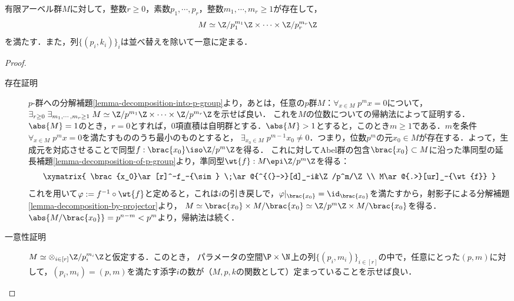\documentclass[uplatex,dvipdfmx]{jsreport}
\begin{document}
\begin{theorem}
    有限アーベル群$M$に対して，整数$r\ge 0$，素数$p_1,\cdots,p_r$，整数$m_1,\cdots,m_r\ge 1$が存在して，
    \[
        M\simeq \Z/p_1^{m_1}\Z\times\cdots\times\Z/p_r^{m_r}\Z
    \]
    を満たす．また，列$\{(p_i,k_i)\}_i$は並べ替えを除いて一意に定まる．
\end{theorem}
\begin{proof}\mbox{}
    \begin{description}
        \item[存在証明] $p$-群への分解補題\ref{lemma-decomposition-into-p-group}より，あとは，任意の$p$群$M$：$\forall_{x\in M}\;p^mx=0$について，$\exists_{r\ge 0}\;\exists_{m_1,\cdots,m_r\ge 1}\;M\simeq\Z/p^{m_1}\Z\times\cdots\times\Z/p^{m_r}\Z$を示せば良い．
        これを$M$の位数についての帰納法によって証明する．$\abs{M}=1$のとき，$r=0$とすれば，$0$項直積は自明群とする．$\abs{M}>1$とすると，このとき$m\ge 1$である．$m$を条件$\forall_{x\in M}\;p^mx=0$を満たすもののうち最小のものとすると，
        $\exists_{x_0\in M}\;p^{m-1}x_0\ne 0$．つまり，位数$p^m$の元$x_0\in M$が存在する．よって，生成元を対応させることで同型$f:\brac{x_0}\iso\Z/p^m\Z$を得る．
        これに対してAbel群の包含$\brac{x_0}\subset M$に沿った準同型の延長補題\ref{lemma-decomposition-of-p-group}より，準同型$\wt{f}:M\epi\Z/p^m\Z$を得る：
        \[\xymatrix{
            \brac{x_0}\ar[r]^-f_-{\sim} \;\ar@{^{(}->}[d]_-i&\Z/p^m/\Z\\
            M\ar@{.>}[ur]_-{\wt{f}}
        }\]
        これを用いて$\varphi:=f^{-1}\circ\wt{f}$と定めると，これは$i$の引き戻しで，$\varphi|_{\brac{x_0}}=\id_{\brac{x_0}}$を満たすから，射影子による分解補題\ref{lemma-decomposition-by-projector}より，
        $M\simeq\brac{x_0}\times M/\brac{x_0}\simeq\Z/p^m\Z\times M/\brac{x_0}$を得る．
        $\abs{M/\brac{x_0}}=p^{n-m}<p^m$より，帰納法は続く．
        \item[一意性証明]
        $M\simeq\otimes_{i\in[r]}\Z/p_i^{m_i}\Z$と仮定する．このとき，
        パラメータの空間$\P\times\N$上の列$\{(p_i,m_i)\}_{i\in[r]}$の中で，任意にとった$(p,m)$に対して，$(p_i,m_i)=(p,m)$を満たす添字$i$の数が（$M,p,k$の関数として）定まっていることを示せば良い．


\end{description}
\end{proof}
\end{document}
